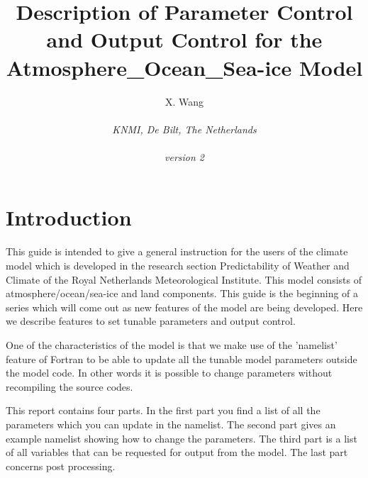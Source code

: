 
\renewcommand{\textwidth}{14cm}
\renewcommand{\textheight}{22cm}
\renewcommand{\topmargin}{0cm}



\tableofcontents

\title{Description of Parameter Control and Output Control for the Atmosphere\_Ocean\_Sea-ice Model}
\author{X. Wang\\ 
        \\ {\em KNMI, De Bilt, The Netherlands} \\ 
        \\ {\em version 2} \\ }
\maketitle


\baselineskip=18pt

\section{Introduction}


This guide is intended to give a general instruction for the users of the climate
model which is developed in the  research section Predictability of Weather and Climate
of the Royal Netherlands Meteorological Institute. This model consists of atmosphere/ocean/sea-ice 
and land components. This guide is the beginning of a series which will  
come out as new features of the model are being developed. Here we describe 
features to set tunable parameters and output control.


One of the characteristics of the model is that we make use of the 'namelist' feature of 
Fortran to be able to update all the tunable model parameters outside
the model code. In other words it is possible to change parameters without recompiling 
the source codes. 

This report contains four parts. In the first part you find a list of all the parameters
which you can update in the namelist. The second part gives an example namelist
showing how to change the parameters. The third part is a list of all 
variables that can be requested for output from the model.
The last part concerns post processing.

